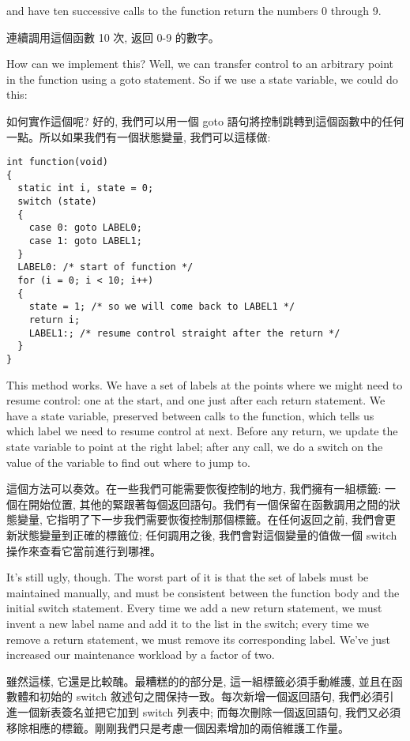 \documentclass[12pt]{article}
\begin{document}
\begin{CJK}{UTF8}{bsmi}
and have ten successive calls to the function return the numbers 0 through 9.

連續調用這個函數 10 次, 返回 0-9 的數字。 

How can we implement this? Well, we can transfer control to an arbitrary point in the function using a goto statement. So if we use a state variable, we could do this:

如何實作這個呢? 好的, 我們可以用一個 goto 語句將控制跳轉到這個函數中的任何一點。所以如果我們有一個狀態變量, 我們可以這樣做:

\begin{lstlisting}[basicstyle=\footnotesize, breaklines=true]
int function(void) 
{
  static int i, state = 0;
  switch (state) 
  {
    case 0: goto LABEL0;
    case 1: goto LABEL1;
  }
  LABEL0: /* start of function */
  for (i = 0; i < 10; i++) 
  {
    state = 1; /* so we will come back to LABEL1 */
    return i;
    LABEL1:; /* resume control straight after the return */
  }
}
\end{lstlisting}

This method works. We have a set of labels at the points where we might need to resume control: one at the start, and one just after each return statement. We have a state variable, preserved between calls to the function, which tells us which label we need to resume control at next. Before any return, we update the state variable to point at the right label; after any call, we do a switch on the value of the variable to find out where to jump to.

這個方法可以奏效。在一些我們可能需要恢復控制的地方, 我們擁有一組標籤: 一個在開始位置, 其他的緊跟著每個返回語句。我們有一個保留在函數調用之間的狀態變量, 它指明了下一步我們需要恢復控制那個標籤。在任何返回之前, 我們會更新狀態變量到正確的標籤位;
任何調用之後, 我們會對這個變量的值做一個 switch 操作來查看它當前進行到哪裡。

It's still ugly, though. The worst part of it is that the set of labels must be maintained manually, and must be consistent between the function body and the initial switch statement. Every time we add a new return statement, we must invent a new label name and add it to the list in the switch; every time we remove a return statement, we must remove its corresponding label. We've just increased our maintenance workload by a factor of two.


雖然這樣, 它還是比較醜。最糟糕的的部分是, 這一組標籤必須手動維護, 並且在函數體和初始的 switch 敘述句之間保持一致。每次新增一個返回語句, 我們必須引進一個新表簽名並把它加到 switch 列表中;
而每次刪除一個返回語句, 我們又必須移除相應的標籤。剛剛我們只是考慮一個因素增加的兩倍維護工作量。


\end{CJK}
\end{document}
